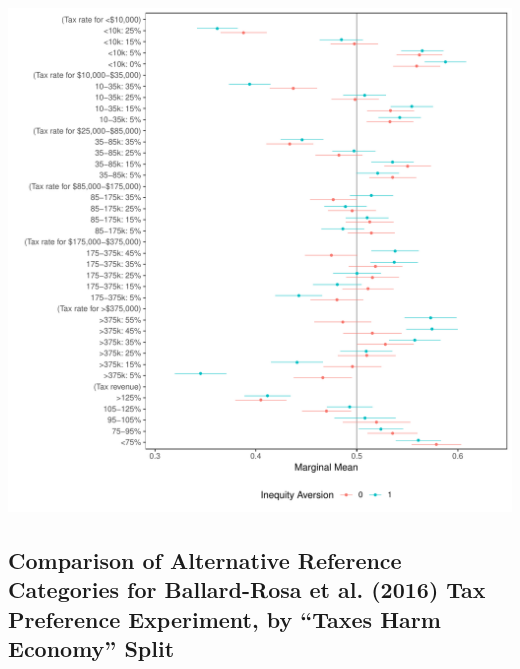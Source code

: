 \documentclass[a4paper,12pt]{article}\usepackage[]{graphicx}\usepackage[]{color}
\makeatletter
\def\maxwidth{ %
  \ifdim\Gin@nat@width>\linewidth
    \linewidth
  \else
    \Gin@nat@width
  \fi
}
\newenvironment{knitrout}{}{} %
\makeatother
\begin{document}
\begin{knitrout}
\color{fgcolor}
\includegraphics[width=\maxwidth]{figure/bms_subgroup_mm_appendix2-1} 

\end{knitrout}

\clearpage

\subsection{Comparison of Alternative Reference Categories for Ballard-Rosa et al. (2016) Tax Preference Experiment, by ``Taxes Harm Economy'' Split}
\end{document}
